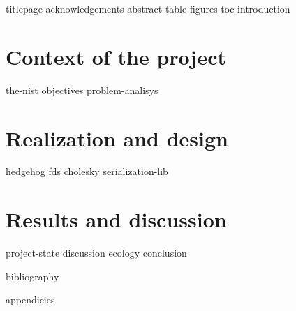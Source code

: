 \documentclass[12pt]{article}
\begin{document}
    {titlepage}
    {acknowledgements}
    {abstract}
    {table-figures}
    {toc}
    {introduction}


    \clearpage{}
    \part{Context of the project}

    {the-nist}
    {objectives}
    {problem-analisys}

    \clearpage{}
    \part{Realization and design}

    {hedgehog}
    {fds}
    {cholesky}
    {serialization-lib}

    \clearpage{}
    \part{Results and discussion}

    {project-state}
    {discussion}
    {ecology}
    {conclusion}


    {bibliography}

    \clearpage{}
    \printglossaries

    {appendicies}
\end{document}
